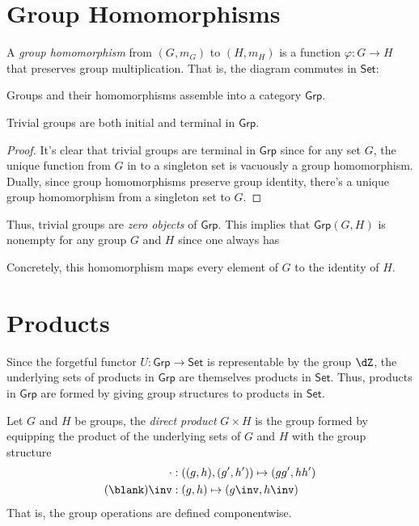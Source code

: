 \documentclass{amsart}
\begin{document}
\section{Group Homomorphisms}
\label{sec:group-homomorphisms}

\begin{defn}
  A \emph{group homomorphism} from $(G,m_{G})$ to $(H,m_{H})$ is a function $\varphi : G \to H$ that preserves group multiplication.
  That is, the diagram commutes in $\mathsf{Set}$:
  
\end{defn}

\begin{lem}
  Groups and their homomorphisms assemble into a category $\mathsf{Grp}$.
\end{lem}

\begin{lem}
  Trivial groups are both initial and terminal in $\mathsf{Grp}$.
\end{lem}
\begin{proof}
  It's clear that trivial groups are terminal in $\mathsf{Grp}$ since for any set $G$, the unique function from $G$ in to a singleton set is vacuously a group homomorphism.
  Dually, since group homomorphisms preserve group identity, there's a unique group homomorphism from a singleton set to $G$.
\end{proof}

Thus, trivial groups are \emph{zero objects} of $\mathsf{Grp}$.
This implies that $\mathsf{Grp}(G,H)$ is nonempty for any group $G$ and $H$ since one always has

Concretely, this homomorphism maps every element of $G$ to the identity of $H$.

\section{Products}
\label{sec:products}

Since the forgetful functor $U : \mathsf{Grp} \to \mathsf{Set}$ is representable by the group $\dZ$, the underlying sets of products in $\mathsf{Grp}$ are themselves products in $\mathsf{Set}$.
Thus, products in $\mathsf{Grp}$ are formed by giving group structures to products in $\mathsf{Set}$.

\begin{defn}
  Let $G$ and $H$ be groups, the \emph{direct product} $G \times H$ is the group formed by equipping the product of the underlying sets of $G$ and $H$ with the group structure
\begin{align}
  \cdot &: ((g,h),(g',h')) \mapsto (gg',hh')\\
  (\blank)\inv &: (g,h) \mapsto (g\inv,h\inv)
\end{align}
That is, the group operations are defined componentwise.
\end{defn}
\end{document}
